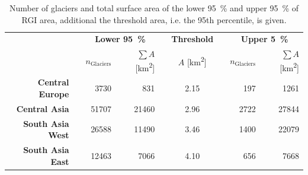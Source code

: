       \begin{table}[htp]
        \centering
        \small

        \caption{Number of glaciers and total surface area of the lower \SI{95}{\percent} and upper \SI{95}{\percent}  of RGI area, additional the threshold area, i.e. the 95th percentile, is given.}
        \label{tab:area_percentile}
          
        \begin{tabular}{@{}rlrrlclrr@{}}
          \toprule
          {} & \phantom{a} & \multicolumn{2}{c}{\textbf{Lower \SI{95}{\percent}}} & \phantom{a} & \textbf{Threshold} & \phantom{a} & \multicolumn{2}{c}{\textbf{Upper \SI{5}{\percent}}} \\
          {} & {} & $n_\text{Glaciers}$ & $\sum A$ [\si{\square\kilo\meter}] & {} & $A$ [\si{\square\kilo\meter}] & {} & $n_\text{Glaciers}$ & $\sum A$ [\si{\square\kilo\meter}] \\
          \midrule
          \textbf{Central Europe} & & 3730 & 831 & & 2.15 & & 197 & 1261 \\
          \textbf{Central Asia} & & 51707 & 21460 & & 2.96 & & 2722 & 27844 \\
          \textbf{South Asia West} & & 26588 & 11490 & & 3.46 & & 1400 & 22079 \\
          \textbf{South Asia East} & & 12463 & 7066 & & 4.10 & & 656 & 7668 \\

          \bottomrule
        \end{tabular}
      \end{table}

    
  
